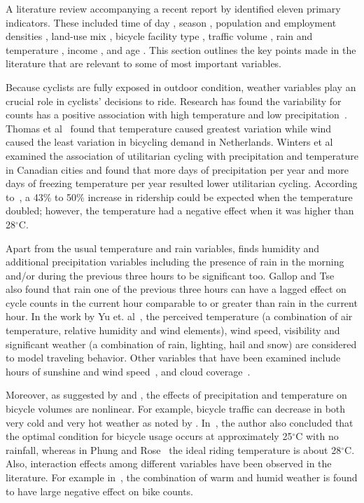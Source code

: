 \documentclass [11pt, proquest] {uwthesis}[2015/03/03]
\begin{document}
A literature review accompanying a recent report by \cite{Bassok:2011aa} identified eleven primary indicators. These included 
time of day \cite{Schwartz:1999aa}, season \cite{Niemeier:1996aa}, population and employment densities \cite{McCahil:2008aa,Pinjari:2009aa}, land-use mix \cite{Pinjari:2009aa}, bicycle facility type \cite{Hunt:2007aa}, traffic volume \cite{McDonald:2007aa}, rain and temperature \cite{Niemeier:1996aa,Parkin:2008aa}, income \cite{Turner:1998aa}, and age \cite{Hunt:2007aa}. This section outlines the key points made in the literature that are relevant to some of most important variables. 

Because cyclists are fully exposed in outdoor condition, weather variables play an crucial role in cyclists' decisions to ride. Research has found the variability for counts has a positive association with high temperature and low precipitation~\cite{Niemeier:1996aa,Parkin:2008aa}. Thomas et al~\cite{Thomas:2009aa} found that temperature caused greatest variation while wind caused the least variation in bicycling demand in Netherlands. Winters et al~\cite{Winters07} examined the association of utilitarian cycling with precipitation and temperature in Canadian cities and found that more days of precipitation per year and more days of freezing temperature per year resulted lower utilitarian cycling. According to~\cite{Miranda-Moreno:2011aa}, a 43\% to 50\% increase in ridership could be expected when the temperature doubled; however, the temperature had a negative effect when it was higher than 28$^\circ$C.

Apart from the usual temperature and rain variables, \cite{Miranda-Moreno:2011aa} finds humidity and additional precipitation variables including the presence of rain in the morning and/or during the previous three hours to be significant too. Gallop and Tse~\cite{Gallop:2012aa} also found that rain one of the previous three hours can have a lagged effect on cycle counts in the current hour comparable to or greater than rain in the current hour. In the work by Yu et. al~\cite{Yu09}, the perceived temperature (a combination of air temperature, relative humidity and wind elements), wind speed, visibility and significant weather (a combination of rain, lighting, hail and snow) are considered to model traveling behavior. Other variables that have been examined include hours of sunshine and wind speed~\cite{Thomas12}, and cloud coverage~\cite{Hanson77}.

Moreover, as suggested by \cite{Lewin:2011aa} and \cite{Thomas:2009aa}, the effects of precipitation and temperature on bicycle volumes are nonlinear. For example, bicycle traffic can decrease in both very cold and very hot weather as noted by \cite{Richardson:2000aa}. In~\cite{Richardson:2000aa}, the author also concluded that the optimal condition for bicycle usage occurs at approximately 25$^\circ$C with no rainfall, whereas in Phung and Rose~\cite{Rose07} the ideal riding temperature is about 28$^\circ$C. Also, interaction effects among different variables have been observed in the literature. For example in~\cite{Miranda-Moreno:2011aa}, the combination of warm and humid weather is found to have large negative effect on bike counts.
\end{document}
